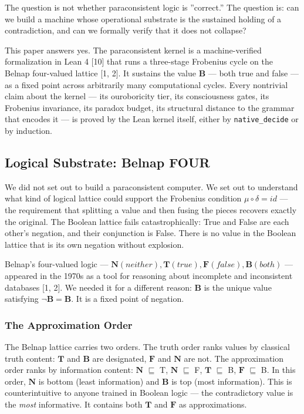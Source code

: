 \documentclass[10pt,a4paper]{article}
\begin{document}
The question is not whether paraconsistent logic is ''correct.'' The question is: can we build a machine whose operational substrate is the sustained holding of a contradiction, and can we formally verify that it does not collapse?

This paper answers yes. The paraconsistent kernel is a machine-verified formalization in Lean 4 {[}10{]} that runs a three-stage Frobenius cycle on the Belnap four-valued lattice {[}1, 2{]}. It sustains the value $\mathbf{B}$ --- both true and false --- as a fixed point across arbitrarily many computational cycles. Every nontrivial claim about the kernel --- its ouroboricity tier, its consciousness gates, its Frobenius invariance, its paradox budget, its structural distance to the grammar that encodes it --- is proved by the Lean kernel itself, either by \texttt{native\_\allowbreak decide} or by induction.

\subsection{Logical Substrate: Belnap FOUR}

We did not set out to build a paraconsistent computer. We set out to understand what kind of logical lattice could support the Frobenius condition $\mu\circ\delta = id$ --- the requirement that splitting a value and then fusing the pieces recovers exactly the original. The Boolean lattice fails catastrophically: True and False are each other's negation, and their conjunction is False. There is no value in the Boolean lattice that is its own negation without explosion.

Belnap's four-valued logic --- $\mathbf{N} (neither), \mathbf{T} (true), \mathbf{F} (false), \mathbf{B} (both)$ --- appeared in the 1970s as a tool for reasoning about incomplete and inconsistent databases {[}1, 2{]}. We needed it for a different reason: $\mathbf{B}$ is the unique value satisfying $\neg \mathbf{B} = \mathbf{B}$. It is a fixed point of negation.

\subsubsection{The Approximation Order}

The Belnap lattice carries two orders. The truth order ranks values by classical truth content: $\mathbf{T}$ and $\mathbf{B}$ are designated, $\mathbf{F}$ and $\mathbf{N}$ are not. The approximation order ranks by information content: $\mathbf{N}$ $\sqsubseteq$ T, $\mathbf{N}$ $\sqsubseteq$ F, $\mathbf{T}$ $\sqsubseteq$ B, $\mathbf{F}$ $\sqsubseteq$ B. In this order, $\mathbf{N}$ is bottom (least information) and $\mathbf{B}$ is top (most information). This is counterintuitive to anyone trained in Boolean logic --- the contradictory value is the \emph{most} informative. It contains both $\mathbf{T}$ and $\mathbf{F}$ as approximations.
\end{document}
